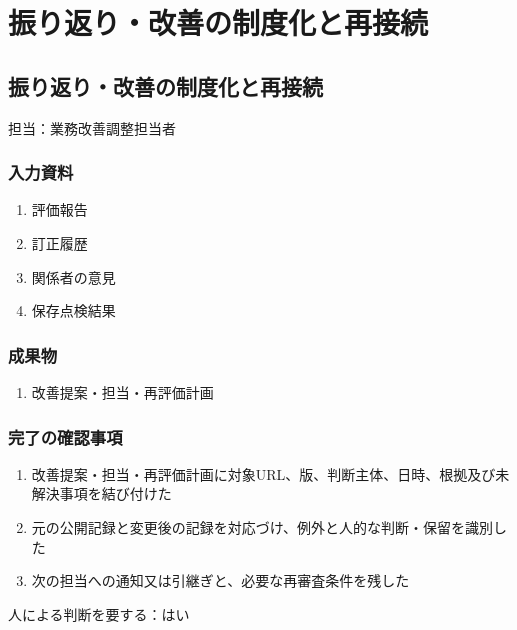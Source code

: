 \documentclass[a4paper,11pt]{article}
\begin{document}
\section{振り返り・改善の制度化と再接続}
\subsection{振り返り・改善の制度化と再接続}
\par 担当：業務改善調整担当者\par\medskip
\subsubsection*{入力資料}
\begin{enumerate}[leftmargin=2em,itemsep=0.35em]
\item 評価報告
\item 訂正履歴
\item 関係者の意見
\item 保存点検結果
\end{enumerate}
\subsubsection*{成果物}
\begin{enumerate}[leftmargin=2em,itemsep=0.35em]
\item 改善提案・担当・再評価計画
\end{enumerate}
\subsubsection*{完了の確認事項}
\begin{enumerate}[leftmargin=2em,itemsep=0.35em]
\item 改善提案・担当・再評価計画に対象URL、版、判断主体、日時、根拠及び未解決事項を結び付けた
\item 元の公開記録と変更後の記録を対応づけ、例外と人的な判断・保留を識別した
\item 次の担当への通知又は引継ぎと、必要な再審査条件を残した
\end{enumerate}
\par 人による判断を要する：はい\par\medskip
\end{document}

